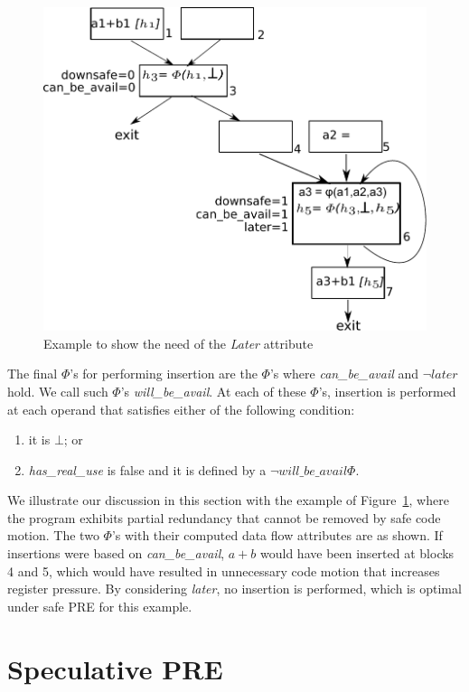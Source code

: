 \begin{figure}
\centering
\includegraphics[scale=0.45]{fig-later-example.pdf}
\caption{Example to show the need of the \emph{Later} attribute}
\label{fig: later-example}
\end{figure}

The final $\Phi$'s for performing insertion are the $\Phi$'s where 
\emph{can\_be\_avail} and $\neg later$ hold.  We call such $\Phi$'s
\emph{will\_be\_avail}.  At each of these $\Phi$'s,
insertion is performed at each operand that satisfies either of the following
condition:
\begin{enumerate}
\item it is $\bot$; or
\item \emph{has\_real\_use} is false and it is defined by a 
$\neg will\_be\_avail \Phi$.
\end{enumerate}

We illustrate our discussion in this section with the example of 
Figure~\ref{fig: later-example}, where the program exhibits partial redundancy
that cannot be removed by safe code motion.  The two $\Phi$'s with their 
computed data flow attributes are as shown.  If insertions were based on
\emph{can\_be\_avail}, $a+b$ would have been inserted at blocks 4 and 5,
which would have resulted in unnecessary code motion that increases
register pressure.  By considering \emph{later}, no insertion is performed,
which is optimal under safe PRE for this example.
 
\section{Speculative PRE}

